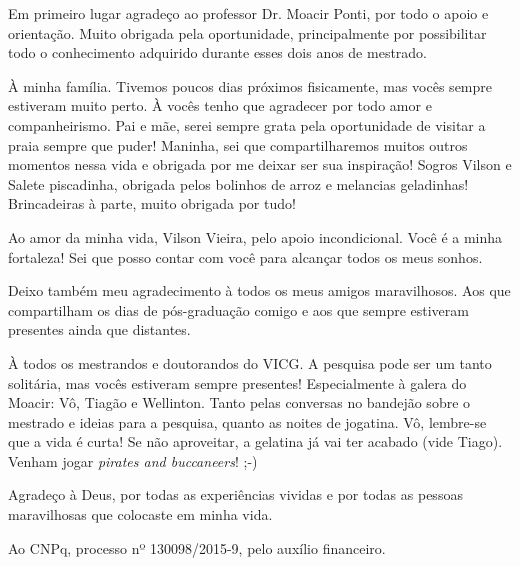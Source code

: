 
Em primeiro lugar agradeço ao professor Dr. Moacir Ponti, por todo o apoio e orientação. Muito obrigada pela oportunidade, principalmente por possibilitar todo o conhecimento adquirido durante esses dois anos de mestrado.

À minha família. Tivemos poucos dias próximos fisicamente, mas vocês sempre estiveram muito perto. À vocês tenho que agradecer por todo amor e companheirismo. Pai e mãe, serei sempre grata pela oportunidade de visitar a praia sempre que puder! Maninha, sei que compartilharemos muitos outros momentos nessa vida e obrigada por me deixar ser sua inspiração! Sogros Vilson e Salete piscadinha, obrigada pelos bolinhos de arroz e melancias geladinhas! Brincadeiras à parte, muito obrigada por tudo!

Ao amor da minha vida, Vilson Vieira, pelo apoio incondicional. Você é a minha fortaleza! Sei que posso contar com você para alcançar todos os meus sonhos.

Deixo também meu agradecimento à todos os meus amigos maravilhosos. Aos que compartilham os dias de pós-graduação comigo e aos que sempre estiveram presentes ainda que distantes.

À todos os mestrandos e doutorandos do VICG. A pesquisa pode ser um tanto solitária, mas vocês estiveram sempre presentes! Especialmente à galera do Moacir: Vô, Tiagão e Wellinton. Tanto pelas conversas no bandejão sobre o mestrado e ideias para a pesquisa, quanto as noites de jogatina. Vô, lembre-se que a vida é curta! Se não aproveitar, a gelatina já vai ter acabado (vide Tiago). Venham jogar \textit{pirates and buccaneers}! ;-)

Agradeço à Deus, por todas as experiências vividas e por todas as pessoas maravilhosas que colocaste em minha vida.

Ao CNPq, processo nº 130098/2015-9, pelo auxílio financeiro.

